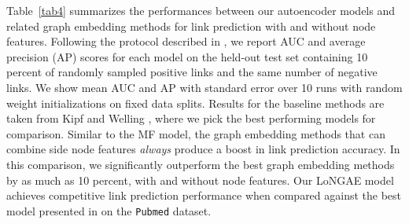 \documentclass[letterpaper, conference]{IEEEtran}
\begin{document}
Table~\ref{tab4} summarizes the performances between our autoencoder models and related graph embedding methods for link prediction with and without node features. Following the protocol described in \cite{VGAE:2016}, we report AUC and average precision (AP) scores for each model on the held-out test set containing 10 percent of randomly sampled positive links and the same number of negative links. We show mean AUC and AP with standard error over 10 runs with random weight initializations on fixed data splits. Results for the baseline methods are taken from Kipf and Welling \cite{VGAE:2016}, where we pick the best performing models for comparison. Similar to the MF model, the graph embedding methods that can combine side node features \emph{always} produce a boost in link prediction accuracy. In this comparison, we significantly outperform the best graph embedding methods by as much as 10 percent, with and without node features. Our LoNGAE model achieves competitive link prediction performance when compared against the best model presented in \cite{VGAE:2016} on the \texttt{Pubmed} dataset.
\end{document}
